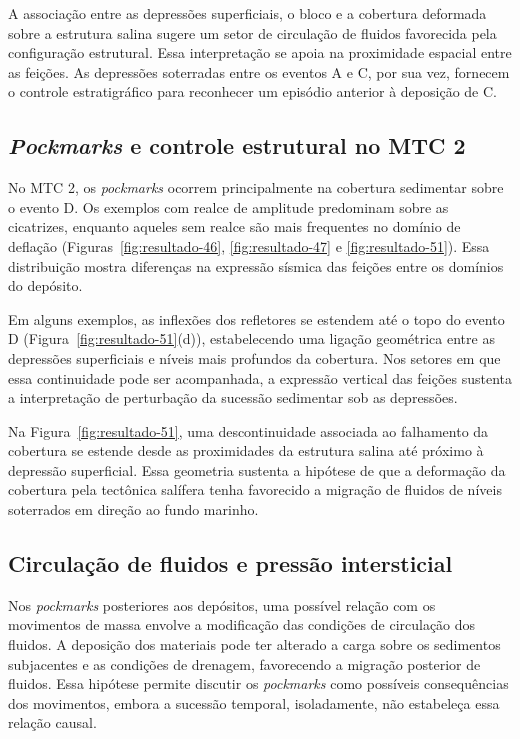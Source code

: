 A associação entre as depressões superficiais, o bloco e a cobertura deformada sobre a estrutura salina sugere um setor de circulação de fluidos favorecida pela configuração estrutural. Essa interpretação se apoia na proximidade espacial entre as feições. As depressões soterradas entre os eventos A e C, por sua vez, fornecem o controle estratigráfico para reconhecer um episódio anterior à deposição de C.

\subsection{\textit{Pockmarks} e controle estrutural no MTC 2}\label{sec:6-4-3}

No MTC 2, os \textit{pockmarks} ocorrem principalmente na cobertura sedimentar sobre o evento D. Os exemplos com realce de amplitude predominam sobre as cicatrizes, enquanto aqueles sem realce são mais frequentes no domínio de deflação (Figuras~\ref{fig:resultado-46}, \ref{fig:resultado-47} e \ref{fig:resultado-51}). Essa distribuição mostra diferenças na expressão sísmica das feições entre os domínios do depósito.

Em alguns exemplos, as inflexões dos refletores se estendem até o topo do evento D (Figura~\ref{fig:resultado-51}(d)), estabelecendo uma ligação geométrica entre as depressões superficiais e níveis mais profundos da cobertura. Nos setores em que essa continuidade pode ser acompanhada, a expressão vertical das feições sustenta a interpretação de perturbação da sucessão sedimentar sob as depressões.

Na Figura~\ref{fig:resultado-51}, uma descontinuidade associada ao falhamento da cobertura se estende desde as proximidades da estrutura salina até próximo à depressão superficial. Essa geometria sustenta a hipótese de que a deformação da cobertura pela tectônica salífera tenha favorecido a migração de fluidos de níveis soterrados em direção ao fundo marinho.

\subsection{Circulação de fluidos e pressão intersticial}\label{sec:6-4-4}

Nos \textit{pockmarks} posteriores aos depósitos, uma possível relação com os movimentos de massa envolve a modificação das condições de circulação dos fluidos. A deposição dos materiais pode ter alterado a carga sobre os sedimentos subjacentes e as condições de drenagem, favorecendo a migração posterior de fluidos. Essa hipótese permite discutir os \textit{pockmarks} como possíveis consequências dos movimentos, embora a sucessão temporal, isoladamente, não estabeleça essa relação causal.


